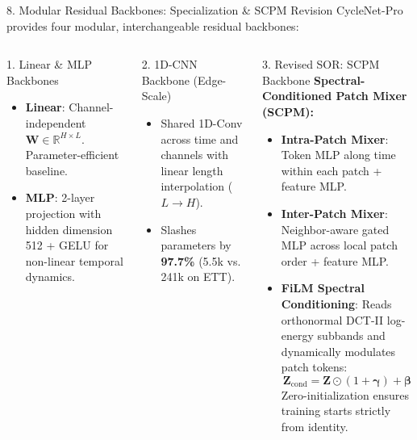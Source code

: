 \documentclass[aspectratio=169, 10pt]{beamer}
\begin{document}
\begin{frame}{8. Modular Residual Backbones: Specialization \& SCPM Revision}
CycleNet-Pro provides four modular, interchangeable residual backbones:
\vspace{0.15cm}
\begin{columns}[T]
\begin{block}{1. Linear \& MLP Backbones}
\begin{itemize}
    \item \textbf{Linear}: Channel-independent $\mathbf{W} \in \mathbb{R}^{H \times L}$. Parameter-efficient baseline.
    \item \textbf{MLP}: 2-layer projection with hidden dimension 512 + GELU for non-linear temporal dynamics.
\end{itemize}
\end{block}
\begin{block}{2. 1D-CNN Backbone (Edge-Scale)}
\begin{itemize}
    \item Shared 1D-Conv across time and channels with linear length interpolation ($L \to H$).
    \item Slashes parameters by \textbf{97.7\%} (5.5k vs. 241k on ETT).
\end{itemize}
\end{block}

\begin{exampleblock}{3. Revised SOR: SCPM Backbone}
\textbf{Spectral-Conditioned Patch Mixer (SCPM):}
\begin{itemize}
    \item \textbf{Intra-Patch Mixer}: Token MLP along time within each patch + feature MLP.
    \item \textbf{Inter-Patch Mixer}: Neighbor-aware gated MLP across local patch order + feature MLP.
    \item \textbf{FiLM Spectral Conditioning}: Reads orthonormal DCT-II log-energy subbands and dynamically modulates patch tokens:
    $$\mathbf{Z}_{\text{cond}} = \mathbf{Z} \odot (1 + \boldsymbol{\gamma}) + \boldsymbol{\beta}$$
    Zero-initialization ensures training starts strictly from identity.
\end{itemize}
\end{exampleblock}
\end{columns}
\end{frame}
\end{document}
